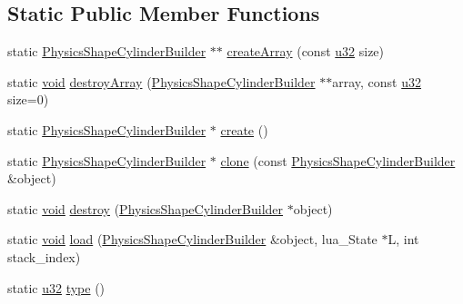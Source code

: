 \subsection*{Static Public Member Functions}
\begin{DoxyCompactItemize}
\item 
static \mbox{\hyperlink{classnjli_1_1_physics_shape_cylinder_builder}{Physics\+Shape\+Cylinder\+Builder}} $\ast$$\ast$ \mbox{\hyperlink{classnjli_1_1_physics_shape_cylinder_builder_a311d45910de2aad5e481c2162184ae12}{create\+Array}} (const \mbox{\hyperlink{_util_8h_a10e94b422ef0c20dcdec20d31a1f5049}{u32}} size)
\item 
static \mbox{\hyperlink{_thread_8h_af1e856da2e658414cb2456cb6f7ebc66}{void}} \mbox{\hyperlink{classnjli_1_1_physics_shape_cylinder_builder_a105dd096a887c907388abd4033dea3bb}{destroy\+Array}} (\mbox{\hyperlink{classnjli_1_1_physics_shape_cylinder_builder}{Physics\+Shape\+Cylinder\+Builder}} $\ast$$\ast$array, const \mbox{\hyperlink{_util_8h_a10e94b422ef0c20dcdec20d31a1f5049}{u32}} size=0)
\item 
static \mbox{\hyperlink{classnjli_1_1_physics_shape_cylinder_builder}{Physics\+Shape\+Cylinder\+Builder}} $\ast$ \mbox{\hyperlink{classnjli_1_1_physics_shape_cylinder_builder_aefd37a42f1a5cd301ad2db9194cbfa9e}{create}} ()
\item 
static \mbox{\hyperlink{classnjli_1_1_physics_shape_cylinder_builder}{Physics\+Shape\+Cylinder\+Builder}} $\ast$ \mbox{\hyperlink{classnjli_1_1_physics_shape_cylinder_builder_a4294a014b8dfb62b8c613caa4624b565}{clone}} (const \mbox{\hyperlink{classnjli_1_1_physics_shape_cylinder_builder}{Physics\+Shape\+Cylinder\+Builder}} \&object)
\item 
static \mbox{\hyperlink{_thread_8h_af1e856da2e658414cb2456cb6f7ebc66}{void}} \mbox{\hyperlink{classnjli_1_1_physics_shape_cylinder_builder_aa508b55f868d88ab82c2b87070006cd8}{destroy}} (\mbox{\hyperlink{classnjli_1_1_physics_shape_cylinder_builder}{Physics\+Shape\+Cylinder\+Builder}} $\ast$object)
\item 
static \mbox{\hyperlink{_thread_8h_af1e856da2e658414cb2456cb6f7ebc66}{void}} \mbox{\hyperlink{classnjli_1_1_physics_shape_cylinder_builder_a39d1bb86df64ffe8ecf56ec1b195ac98}{load}} (\mbox{\hyperlink{classnjli_1_1_physics_shape_cylinder_builder}{Physics\+Shape\+Cylinder\+Builder}} \&object, lua\+\_\+\+State $\ast$L, int stack\+\_\+index)
\item 
static \mbox{\hyperlink{_util_8h_a10e94b422ef0c20dcdec20d31a1f5049}{u32}} \mbox{\hyperlink{classnjli_1_1_physics_shape_cylinder_builder_a660431da9254ce3526856075bd85a535}{type}} ()
\end{DoxyCompactItemize}

